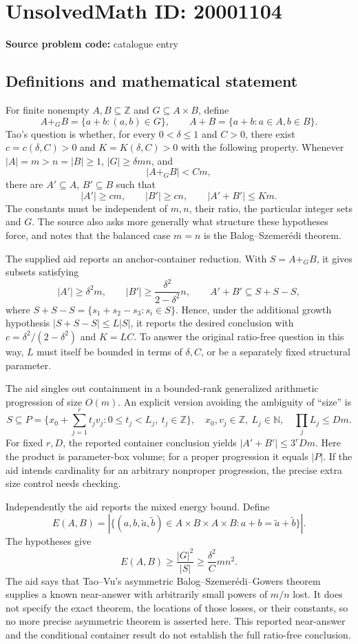 \documentclass[11pt]{article}
\newcommand{\N}{\mathbb{N}}
\newcommand{\Z}{\mathbb{Z}}
\begin{document}
\section*{UnsolvedMath ID: 20001104}
\textbf{Source problem code:} catalogue entry
\subsection{Definitions and mathematical statement}
For finite nonempty \(A,B\subseteq\Z\) and \(G\subseteq A\times B\), define
\[
 A+_G B=\{a+b:(a,b)\in G\},\qquad A+B=\{a+b:a\in A,b\in B\}.
\]
Tao's question is whether, for every \(0<\delta\leq1\) and \(C>0\), there exist \(c=c(\delta,C)>0\) and \(K=K(\delta,C)>0\) with the following property. Whenever \(|A|=m>n=|B|\geq1\), \(|G|\geq\delta mn\), and
\[
 |A+_G B|<Cm,
\]
there are \(A'\subseteq A\), \(B'\subseteq B\) such that
\[
 |A'|\geq cm,\qquad |B'|\geq cn,\qquad |A'+B'|\leq Km.
\]
The constants must be independent of \(m,n\), their ratio, the particular integer sets and \(G\). The source also asks more generally what structure these hypotheses force, and notes that the balanced case \(m=n\) is the Balog--Szemerédi theorem.

The supplied aid reports an anchor-container reduction. With \(S=A+_G B\), it gives subsets satisfying
\[
 |A'|\geq\delta^2m,\qquad
 |B'|\geq\frac{\delta^2}{2-\delta^2}n,\qquad
 A'+B'\subseteq S+S-S,
\]
where \(S+S-S=\{s_1+s_2-s_3:s_i\in S\}\). Hence, under the additional growth hypothesis \(|S+S-S|\leq L|S|\), it reports the desired conclusion with
\(c=\delta^2/(2-\delta^2)\) and \(K=LC\). To answer the original ratio-free question in this way, \(L\) must itself be bounded in terms of \(\delta,C\), or be a separately fixed structural parameter.

The aid singles out containment in a bounded-rank generalized arithmetic progression of size \(O(m)\). An explicit version avoiding the ambiguity of ``size'' is
\[
 S\subseteq P=\{x_0+\textstyle\sum_{j=1}^r t_jv_j:0\leq t_j<L_j,\ t_j\in\Z\},
 \quad x_0,v_j\in\Z,\ L_j\in\N,\quad \prod_jL_j\leq Dm.
\]
For fixed \(r,D\), the reported container conclusion yields \(|A'+B'|\leq3^rDm\). Here the product is parameter-box volume; for a proper progression it equals \(|P|\). If the aid intends cardinality for an arbitrary nonproper progression, the precise extra size control needs checking.

Independently the aid reports the mixed energy bound. Define
\[
 E(A,B)=|\{(a,b,\widetilde a,\widetilde b)\in A\times B\times A\times B:
 a+b=\widetilde a+\widetilde b\}|.
\]
The hypotheses give
\[
 E(A,B)\geq\frac{|G|^2}{|S|}\geq\frac{\delta^2}{C}mn^2.
\]
The aid says that Tao--Vu's asymmetric Balog--Szemerédi--Gowers theorem supplies a known near-answer with arbitrarily small powers of \(m/n\) lost. It does not specify the exact theorem, the locations of those losses, or their constants, so no more precise asymmetric theorem is asserted here. This reported near-answer and the conditional container result do not establish the full ratio-free conclusion.
\end{document}
